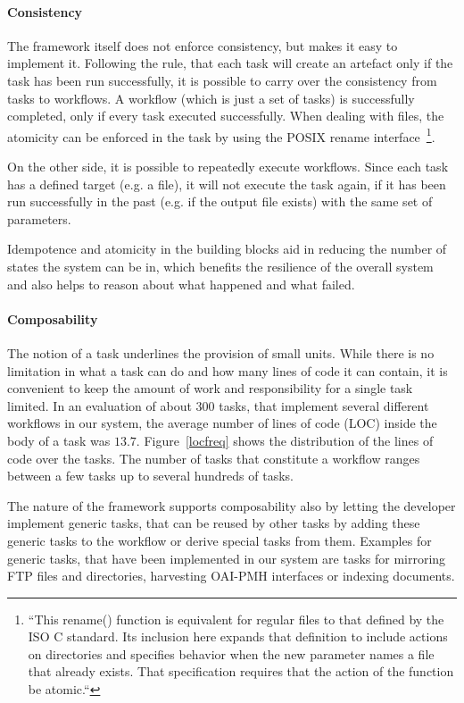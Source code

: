 \documentclass[english]{lni}
\begin{document}
\paragraph{Consistency}

The framework itself does not enforce consistency, but makes it easy
to implement it. Following the rule, that each task will create an
artefact only if the task has been run successfully, it is possible
to carry over the consistency from tasks to workflows. A workflow (which is
just a set of tasks) is successfully completed, only if every
task executed successfully. When dealing with files, the atomicity
can be enforced in the task by using the POSIX rename interface~\cite{posix2004}\footnote{``This rename() function is equivalent for regular files to that defined by the ISO C standard. Its inclusion here expands that definition to include actions on directories and specifies behavior when the new parameter names a file that already exists. That specification requires that the action of the function be atomic.``}.

On the other side, it is possible to repeatedly execute workflows.
Since each task has a defined target (e.g. a file), it will not execute
the task again, if it has been run successfully in the past (e.g. if the output file exists) with the same
set of parameters.

Idempotence and atomicity in the building blocks
aid in reducing the number of states the system
can be in, which benefits the resilience of the overall system and also
helps to reason about what happened and what failed.

\paragraph{Composability}
\label{composability}

The notion of a task underlines the provision of small units. While there is
no limitation in what a task can do and how many lines of code it can contain,
it is convenient to keep the amount of work and responsibility for a
single task limited. In an evaluation of about $300$ tasks, that
implement several different workflows in our system, the average number
of lines of code (LOC) inside the body of a task was $13.7$. Figure~\ref{locfreq} shows
the distribution of the lines of code over the tasks.
The number of tasks that constitute a workflow ranges between
a few tasks up to several hundreds of tasks.

The nature of the framework supports composability also by letting the
developer implement generic tasks, that can be reused by other tasks by
adding these generic tasks to the workflow or derive special tasks
from them. Examples for generic tasks, that have been implemented in our system are
tasks for mirroring FTP files and directories, harvesting OAI-PMH interfaces
or indexing documents.
\end{document}
